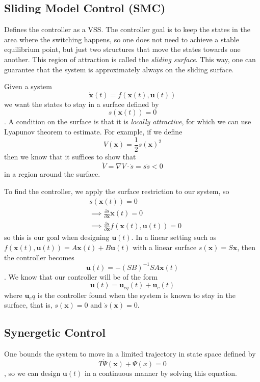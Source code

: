 \documentclass[a4paper]{report}
\begin{document}
\subsection*{Sliding Model Control (SMC)}

Defines the controller as a VSS. The controller goal is to keep the states in the area where the switching happens, so one does not need to achieve a stable equilibrium point, but just two structures that move the states towards one another. This region of attraction is called the \emph{sliding surface}. This way, one can guarantee that the system is approximately always on the sliding surface.

Given a system \[
\bm{\dot{x}}(t) = f\left( \bm{x}(t), \bm{u}(t) \right) 
\] we want the states to stay in a surface defined by \[
s\left( \bm{x}(t) \right) = 0
\]. A condition on the surface is that it is \emph{locally attractive}, for which we can use Lyapunov theorem to estimate. For example, if we define \[
V\left( \bm{x} \right) = \frac{1}{2}s\left( \bm{x} \right) ^{2}
\] then we know that it suffices to show that \[
\dot{V} = \nabla V \cdot \dot{s} = s\dot{s} < 0
\] in a region around the surface.

To find the controller, we apply the surface restriction to our system, so
\begin{align*}
&s\left( \bm{x}(t) \right) = 0 \\
&\implies \frac{\partial s}{\partial \bm{x}} \bm{\dot{x}}(t) = 0 \\
&\implies \frac{\partial s}{\partial \bm{x}} f\left( \bm{x}(t), \bm{u}(t) \right) = 0
\end{align*}
so this is our goal when designing $\bm{u}(t)$. In a linear setting such as $f(\bm{x}(t),\bm{u}(t)) = A\bm{x}(t) + B\bm{u}(t)$ with a linear surface $s(\bm{x}) = S\bm{x}$, then the controller becomes \[
    \bm{u}(t) = -\left( SB \right) ^{-1}SA\bm{x}(t)
\]. We know that our controller will be of the form \[
\bm{u}(t) = \bm{u}_{eq}(t) + \bm{u}_c(t)
\] where $\bm{u}_eq$ is the controller found when the system is known to stay in the surface, that is, $s(\bm{x}) = 0$ and $\dot{s}(\bm{x}) = 0$.


\subsection*{Synergetic Control}

One bounds the system to move in a limited trajectory in state space defined by \[
    T \dot{\Psi}(\bm{x}) + \Psi(x) = 0
\], so we can design $\bm{u}(t)$ in a continuous manner by solving this equation.
\end{document}

